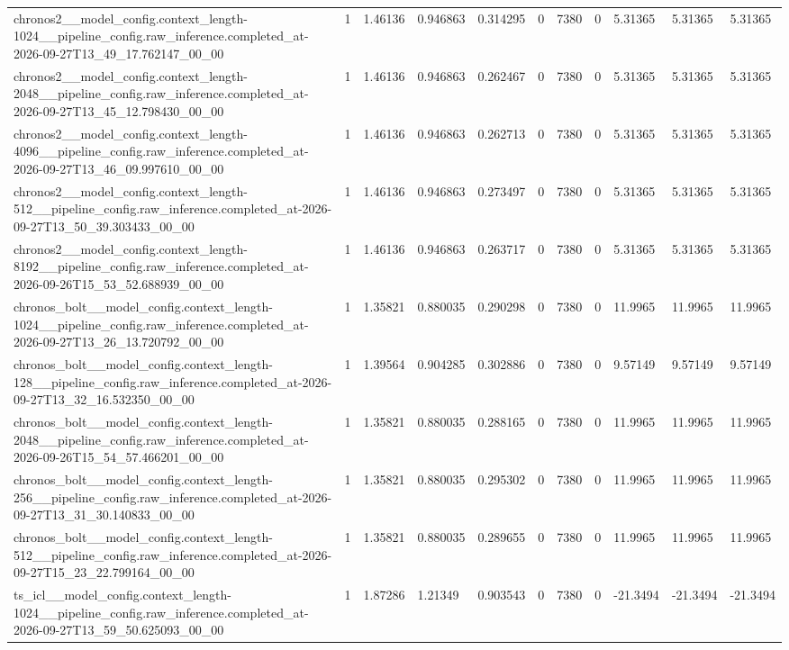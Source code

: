 \begin{tabular}{lllllllllll}
chronos2\_\_model\_config.context\_length-1024\_\_pipeline\_config.raw\_inference.completed\_at-2026-09-27T13\_49\_17.762147\_00\_00 & 1 & 1.46136 & 0.946863 & 0.314295 & 0 & 7380 & 0 & 5.31365 & 5.31365 & 5.31365 \\
chronos2\_\_model\_config.context\_length-2048\_\_pipeline\_config.raw\_inference.completed\_at-2026-09-27T13\_45\_12.798430\_00\_00 & 1 & 1.46136 & 0.946863 & 0.262467 & 0 & 7380 & 0 & 5.31365 & 5.31365 & 5.31365 \\
chronos2\_\_model\_config.context\_length-4096\_\_pipeline\_config.raw\_inference.completed\_at-2026-09-27T13\_46\_09.997610\_00\_00 & 1 & 1.46136 & 0.946863 & 0.262713 & 0 & 7380 & 0 & 5.31365 & 5.31365 & 5.31365 \\
chronos2\_\_model\_config.context\_length-512\_\_pipeline\_config.raw\_inference.completed\_at-2026-09-27T13\_50\_39.303433\_00\_00 & 1 & 1.46136 & 0.946863 & 0.273497 & 0 & 7380 & 0 & 5.31365 & 5.31365 & 5.31365 \\
chronos2\_\_model\_config.context\_length-8192\_\_pipeline\_config.raw\_inference.completed\_at-2026-09-26T15\_53\_52.688939\_00\_00 & 1 & 1.46136 & 0.946863 & 0.263717 & 0 & 7380 & 0 & 5.31365 & 5.31365 & 5.31365 \\
chronos\_bolt\_\_model\_config.context\_length-1024\_\_pipeline\_config.raw\_inference.completed\_at-2026-09-27T13\_26\_13.720792\_00\_00 & 1 & 1.35821 & 0.880035 & 0.290298 & 0 & 7380 & 0 & 11.9965 & 11.9965 & 11.9965 \\
chronos\_bolt\_\_model\_config.context\_length-128\_\_pipeline\_config.raw\_inference.completed\_at-2026-09-27T13\_32\_16.532350\_00\_00 & 1 & 1.39564 & 0.904285 & 0.302886 & 0 & 7380 & 0 & 9.57149 & 9.57149 & 9.57149 \\
chronos\_bolt\_\_model\_config.context\_length-2048\_\_pipeline\_config.raw\_inference.completed\_at-2026-09-26T15\_54\_57.466201\_00\_00 & 1 & 1.35821 & 0.880035 & 0.288165 & 0 & 7380 & 0 & 11.9965 & 11.9965 & 11.9965 \\
chronos\_bolt\_\_model\_config.context\_length-256\_\_pipeline\_config.raw\_inference.completed\_at-2026-09-27T13\_31\_30.140833\_00\_00 & 1 & 1.35821 & 0.880035 & 0.295302 & 0 & 7380 & 0 & 11.9965 & 11.9965 & 11.9965 \\
chronos\_bolt\_\_model\_config.context\_length-512\_\_pipeline\_config.raw\_inference.completed\_at-2026-09-27T15\_23\_22.799164\_00\_00 & 1 & 1.35821 & 0.880035 & 0.289655 & 0 & 7380 & 0 & 11.9965 & 11.9965 & 11.9965 \\
ts\_icl\_\_model\_config.context\_length-1024\_\_pipeline\_config.raw\_inference.completed\_at-2026-09-27T13\_59\_50.625093\_00\_00 & 1 & 1.87286 & 1.21349 & 0.903543 & 0 & 7380 & 0 & -21.3494 & -21.3494 & -21.3494 \\

\end{tabular}
